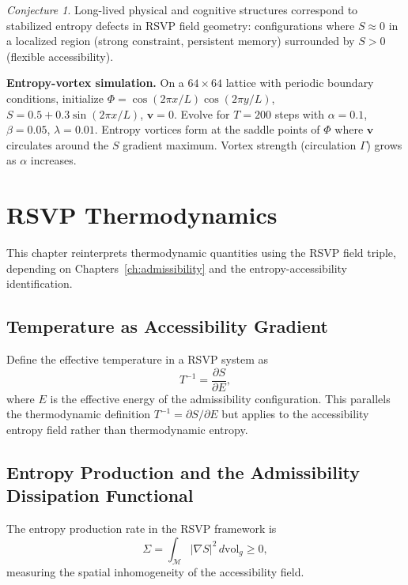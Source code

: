 \documentclass[11pt, openright, twoside]{book}
\theoremstyle{plain}
\theoremstyle{definition}
\theoremstyle{remark}
\newtheorem{conjecture}[theorem]{Conjecture}
\newcommand{\vfield}{\mathbf{v}}
\newcommand{\Sfield}{S}
\begin{document}
\begin{conjecture}
Long-lived physical and cognitive structures correspond to stabilized entropy defects in
RSVP field geometry: configurations where $\Sfield\approx 0$ in a localized region
(strong constraint, persistent memory) surrounded by $\Sfield>0$ (flexible accessibility).
\end{conjecture}

\begin{exbox}
\textbf{Entropy-vortex simulation.} On a $64\times 64$ lattice with periodic boundary
conditions, initialize $\Phi=\cos(2\pi x/L)\cos(2\pi y/L)$, $\Sfield=0.5+0.3\sin(2\pi x/L)$,
$\vfield=0$. Evolve for $T=200$ steps with $\alpha=0.1$, $\beta=0.05$, $\lambda=0.01$.
Entropy vortices form at the saddle points of $\Phi$ where $\vfield$ circulates around the
$\Sfield$ gradient maximum. Vortex strength (circulation $\Gamma$) grows as $\alpha$ increases.
\end{exbox}

\chapter{RSVP Thermodynamics}

\begin{depbox}
This chapter reinterprets thermodynamic quantities using the RSVP field triple, depending
on Chapters~\ref{ch:admissibility} and the entropy-accessibility identification.
\end{depbox}

\section{Temperature as Accessibility Gradient}

Define the effective temperature in a RSVP system as
\begin{equation}
  T^{-1} = \frac{\partial\Sfield}{\partial E},
\end{equation}
where $E$ is the effective energy of the admissibility configuration. This parallels the
thermodynamic definition $T^{-1}=\partial S/\partial E$ but applies to the accessibility
entropy field rather than thermodynamic entropy.

\section{Entropy Production and the Admissibility Dissipation Functional}

The entropy production rate in the RSVP framework is
\begin{equation}
  \Sigma = \int_\mathcal{M}|\nabla\Sfield|^2\,d\mathrm{vol}_g \geq 0,
\end{equation}
measuring the spatial inhomogeneity of the accessibility field.
\end{document}
